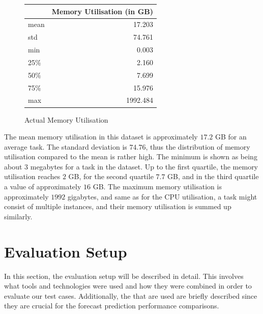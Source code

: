     \begin{figure}
      \centering
      \caption{Actual Memory Utilisation}
      \label{tab:actual-memory-utilisation}
      \begin{tabular}{|l|r|}
        \toprule
        {} &  Memory Utilisation (in GB) \\
        \midrule
        mean  &    17.203 \\
        std   &    74.761 \\
        min   &     0.003 \\
        25\%   &     2.160 \\
        50\%   &     7.699 \\
        75\%   &    15.976 \\
        max   &  1992.484 \\
        \bottomrule
      \end{tabular}
    \end{figure}
    The mean memory utilisation in this dataset is approximately $17.2$ GB for an average task.
    The standard deviation is $74.76$, thus the distribution of memory utilisation compared to the mean is rather high.
    The minimum is shown as being about $3$ megabytes for a task in the dataset.
    Up to the first quartile, the memory utilisation reaches $2$ GB, for the second quartile $7.7$ GB, and in the third quartile a value of approximately $16$ GB.
    The maximum memory utilisation is approximately $1992$ gigabytes, and same as for the CPU utilisation, a task might consist of multiple instances, and their memory utilisation is summed up similarly.
    




\section{Evaluation Setup}
\label{sec:evaluation-setup}

  In this section, the evaluation setup will be described in detail. 
  This involves what tools and technologies were used and how they were combined in order to evaluate our test cases. Additionally, the  that are used are briefly described since they are crucial for the forecast prediction performance comparisons.
  
